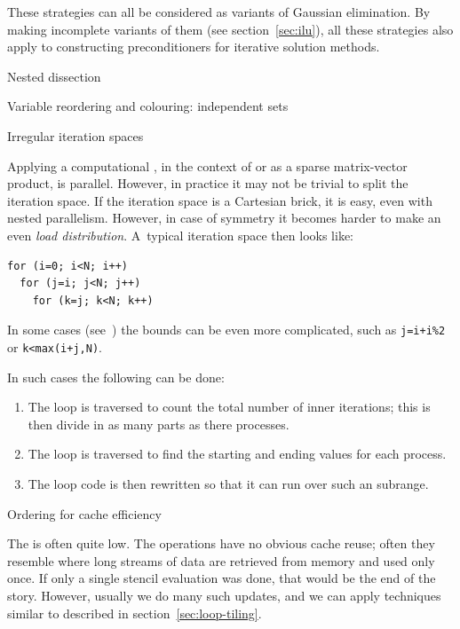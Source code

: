 These strategies can all be considered as variants of Gaussian elimination.
By making incomplete variants of them (see section~\ref{sec:ilu}),
all these strategies also apply to constructing preconditioners
for iterative solution methods.

 {Nested dissection}
\label{sec:dissection}


 {Variable reordering and colouring: independent sets}
\label{sec:redblackgreen}


 {Irregular iteration spaces}
\label{sec:iterationspace}

Applying a computational , in the context of
%
or as a sparse matrix-vector product, is parallel. However, in
practice it may not be trivial to split the iteration space. If the
iteration space is a Cartesian brick, it is easy, even with nested
parallelism. However, in case of symmetry it becomes harder to make an
even
%
\emph{load distribution}.
%
A~typical iteration space then looks like:
\begin{verbatim}
for (i=0; i<N; i++)
  for (j=i; j<N; j++)
    for (k=j; k<N; k++)
\end{verbatim}
In some cases (see~\cite{Briggs:CMB}) the bounds can be even more
complicated, such as \verb/j=i+i%2/ or \verb/k<max(i+j,N)/.

In such cases the following can be done:
\begin{enumerate}
\item The loop is traversed to count the total number of inner
  iterations; this is then divide in as many parts as there processes.
\item The loop is traversed to find the starting and ending 
  values for each process.
\item The loop code is then rewritten so that it can run over such an
   subrange.
\end{enumerate}

 {Ordering for cache efficiency}

The  is often quite
low. The operations have no obvious cache reuse; often they resemble
%
 where long streams of data are retrieved
from memory and used only once. If only a single stencil evaluation
was done, that would be the end of the story. However, usually we do
many such updates, and we can apply techniques similar to
%
 described in section~\ref{sec:loop-tiling}.


